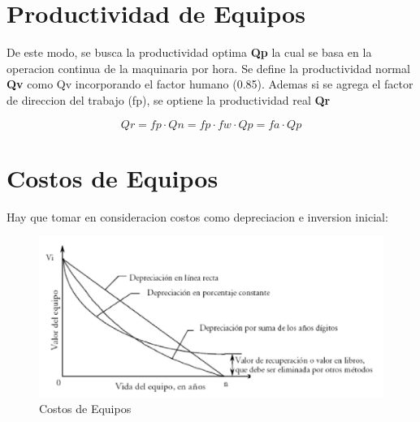 \section{Productividad de Equipos}

De este modo, se busca la productividad optima \textbf{Qp} la cual se basa en la operacion continua de la maquinaria por hora. Se define la productividad normal \textbf{Qv} como Qv incorporando el factor humano (0.85). Ademas si se agrega el factor de direccion del trabajo (fp), se optiene la productividad real \textbf{Qr}

\begin{equation}
    Qr = fp \cdot Qn = fp \cdot fw \cdot Qp = fa \cdot Qp
\end{equation}

\newpage
\section{Costos de Equipos}

Hay que tomar en consideracion costos como depreciacion e inversion inicial:

\begin{figure}[H]
    \centering
    \includegraphics[width=0.8\linewidth]{FOTOS/costo_equipo.png}
    \caption{Costos de Equipos}
    \label{fig:costos}
\end{figure}

